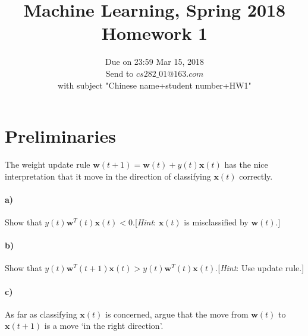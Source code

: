 \documentclass{article}
\begin{document}
\title{Machine Learning, Spring 2018\\Homework 1}
\date{Due on 23:59 Mar 15, 2018\\Send to $cs282\_01@163.com$ \\with subject "Chinese name+student number+HW1"}
\maketitle

%

\section{Preliminaries}
The weight update rule $\mathbf{w}(t+1)=\mathbf{w}(t) + y(t)\mathbf{x}(t)$ has the nice interpretation that it move in the direction of classifying $\mathbf{x}(t) $ correctly.

\paragraph{a)}Show that $y(t)\mathbf{w}^T(t)\mathbf{x}(t)<0$.[\textit{Hint}: $\mathbf{x}(t)$ is misclassified by $\mathbf{w}(t)$.]


\paragraph{b)}Show that $y(t)\mathbf{w}^T(t+1)\mathbf{x}(t)>y(t)\mathbf{w}^T(t)\mathbf{x}(t)$.[\textit{Hint}: Use update rule.]

\paragraph{c)}As far as classifying $\mathbf{x}(t)$ is concerned, argue that the move from $\mathbf{w}(t)$ to $\mathbf{x}(t+1)$ is a move `in the right direction'.




%


\end{document}
